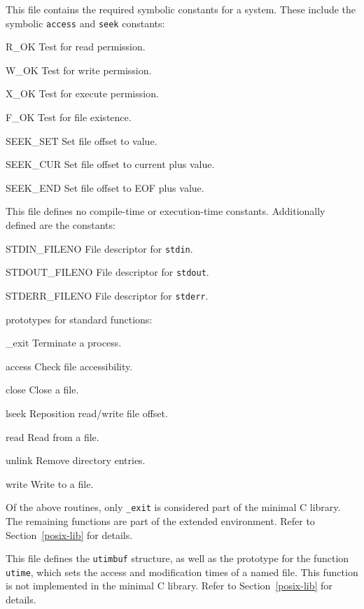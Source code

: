 \begin{apidesc}
	This file contains the required symbolic constants for a \posix{}
	system.
	These include the symbolic {\tt access} and {\tt seek} constants:
	\begin{icsymlist}
		\item[R_OK]
			Test for read permission.
		\item[W_OK]
			Test for write permission.
		\item[X_OK]
			Test for execute permission.
		\item[F_OK]
			Test for file existence.
		\item[SEEK_SET]
			Set file offset to value.
		\item[SEEK_CUR]
			Set file offset to current plus value.
		\item[SEEK_END]
			Set file offset to EOF plus value.
	\end{icsymlist}
	This file defines no \posix{} compile-time or execution-time constants.
	Additionally defined are the constants:
	\begin{icsymlist}
		\item[STDIN_FILENO]
			File descriptor for {\tt stdin}.
		\item[STDOUT_FILENO]
			File descriptor for {\tt stdout}.
		\item[STDERR_FILENO]
			File descriptor for {\tt stderr}.
	\end{icsymlist}
	prototypes for standard \posix{} functions:
	\begin{icsymlist}
		\item[_exit]
			Terminate a process.
		\item[access]
			Check file accessibility.
		\item[close]
			Close a file.
		\item[lseek]
			Reposition read/write file offset.
		\item[read]
			Read from a file.
		\item[unlink]
			Remove directory entries.
		\item[write]
			Write to a file.
	\end{icsymlist}

	Of the above routines, only {\tt _exit} is considered part of the
	minimal C library.  The remaining functions are part of the
	extended \posix{} environment.  Refer to Section~\ref{posix-lib}
	for details.
\end{apidesc}

\label{utime-h}
\begin{apidesc}
	This file defines the {\tt utimbuf} structure, as well as the
	prototype for the \posix{} function {\tt utime}, which sets the
	access and modification times of a named file. This function is not
	implemented in the minimal C library. Refer to Section~\ref{posix-lib}
	for details.
\end{apidesc}

